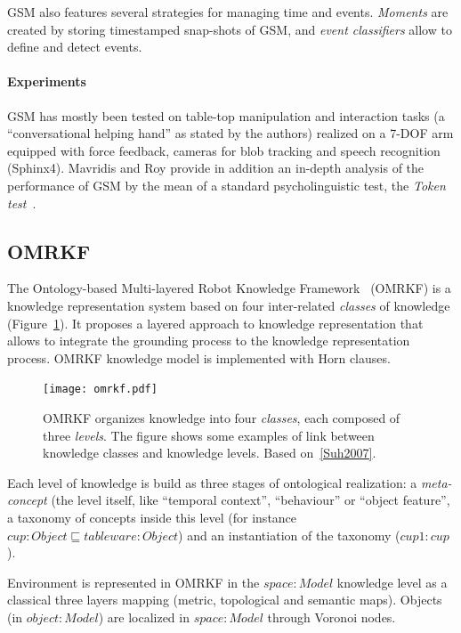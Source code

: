 \documentclass[a4paper, twocolumn]{article}
\begin{document}
GSM also features several strategies for managing time and events.
\emph{Moments} are created by storing timestamped snap-shots of GSM, and
\emph{event classifiers} allow to define and detect events.

\paragraph{Experiments} GSM has mostly been tested on table-top manipulation
and interaction tasks (a ``conversational helping hand'' as stated by the
authors) realized on a 7-DOF arm equipped with force feedback, cameras for blob
tracking and speech recognition (Sphinx4). Mavridis and Roy provide in addition
an in-depth analysis of the performance of GSM by the mean of a standard
psycholinguistic test, the \emph{Token test}~\cite{DiSimoni1978}.

\subsection{OMRKF}
\label{sect|omrkf}

The Ontology-based Multi-layered Robot Knowledge Framework~\cite{Suh2007}
(OMRKF) is a knowledge representation system based on four inter-related
\emph{classes} of knowledge (Figure~\ref{fig|omrkf}). It proposes a layered
approach to knowledge representation that allows to integrate the grounding
process to the knowledge representation process. OMRKF knowledge model is
implemented with Horn clauses.

\begin{figure}
    \centering
    \texttt{[image: omrkf.pdf]}

    \caption{OMRKF organizes knowledge into four \emph{classes}, each composed
    of three \emph{levels}. The figure shows some examples of link between
    knowledge classes and knowledge levels. Based on~\ref{Suh2007}.}

    \label{fig|omrkf}
\end{figure}

Each level of knowledge is build as three stages of ontological realization: a
\emph{meta-concept} (the level itself, like ``temporal context'', ``behaviour''
or ``object feature'', a taxonomy of concepts inside this level (for instance
$cup : Object \sqsubseteq tableware : Object$) and an instantiation of the
taxonomy ($cup1 : cup$).

Environment is represented in OMRKF in the $space : Model$ knowledge level as a
classical three layers mapping (metric, topological and semantic maps). Objects
(in $object : Model$) are localized in $space : Model$ through Voronoi nodes.
\end{document}
